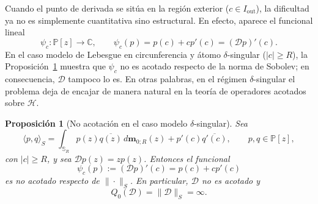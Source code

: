 \documentclass[12pt,a4paper]{article}
\newtheorem{proposition}{Proposición}
\theoremstyle{definition}
\theoremstyle{remark}
\newcommand{\C}{\mathbb{C}}
\newcommand{\Poly}{\mathbb{P}[z]}
\newcommand{\abs}[1]{\left| #1 \right|}
\newcommand{\D}{\mathcal{D}}
\begin{document}
Cuando el punto de derivada se sitúa en la región exterior ($c \in I_{\mathrm{out}}$), la dificultad ya no es simplemente cuantitativa sino estructural. En efecto, aparece el funcional lineal
\[
  \psi_c:\Poly\to\C,
  \qquad
  \psi_c(p)=p(c)+c p'(c)=(\D p)'(c).
\]
En el caso modelo de Lebesgue en circunferencia y átomo $\delta$-singular ($\abs{c}\ge R$), la Proposición~\ref{prop:no_acotacion_modelo_exterior} muestra que $\psi_c$ no es acotado respecto de la norma de Sobolev; en consecuencia, $\D$ tampoco lo es. En otras palabras, en el régimen $\delta$-singular el problema deja de encajar de manera natural en la teoría de operadores acotados sobre $\mathcal{H}$.

\begin{proposition}[No acotación en el caso modelo $\delta$-singular]
  \label{prop:no_acotacion_modelo_exterior}
  Sea
  \[
    \langle p,q\rangle_S
    =
    \int_{\mathbb{S}_R} p(z)\overline{q(z)}\, d\mathbf m_{0;R}(z)
    +
    p'(c)\overline{q'(c)},
    \qquad p,q\in\Poly,
  \]
  con $\abs{c}\ge R$, y sea $\D p(z)=zp(z)$. Entonces el funcional
  \[
    \psi_c(p):=(\D p)'(c)=p(c)+cp'(c)
  \]
  es no acotado respecto de $\|\cdot\|_S$. En particular, $\D$ no es acotado y
  \[
    Q_0(\D)=\|\D\|_S=\infty.
  \]
\end{proposition}
\end{document}
